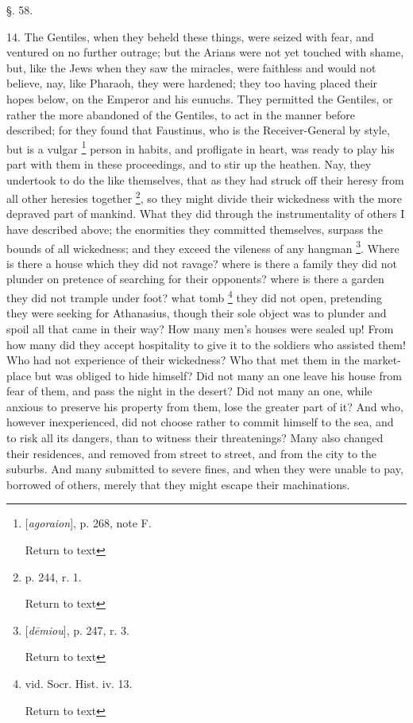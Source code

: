 §. 58.

14. The Gentiles, when they beheld these things,
were seized with fear, and ventured on no further outrage; but the
Arians were not yet touched with shame, but, like the Jews when
they saw the miracles, were faithless and would not believe, nay, like
Pharaoh, they were hardened; they too having placed their hopes below,
on the Emperor and his eunuchs. They permitted the Gentiles, or rather
the more abandoned of the Gentiles, to act in the manner before
described; for they found that Faustinus, who is the Receiver-General
by style, but is a vulgar \footnote{[\emph{agoraion}], p. 268, note F.

Return to text} person in habits, and profligate
in heart, was ready to play his part with them in these proceedings,
and to stir up the heathen. Nay, they undertook to do the like
themselves, that as they had struck off their heresy from all other
heresies together \footnote{p. 244, r. 1.

Return to text}, so they might divide their wickedness
with the more depraved part of mankind. What they did through the
instrumentality of others I have described above; the enormities they
committed themselves, surpass the bounds of all wickedness; and they
exceed the vileness of any hangman \footnote{[\emph{d\={e}miou}], p. 247, r. 3.

Return to text}. Where is there a house
which they did not ravage? where is there a family they did not
plunder on pretence of searching for their opponents? where is there a
garden they did not trample under foot? what tomb \footnote{vid. Socr. Hist. iv. 13.

Return to text} they did
not open, pretending they were seeking for Athanasius, though their
sole object was to plunder and spoil all that came in their way? How
many men's houses were sealed up! From how many did they accept
hospitality to give it to the soldiers who assisted them! Who had not
experience of their wickedness? Who that met them in the market-place
but was obliged to hide himself? Did not many an one leave his house
from fear of them, and pass the night in the desert? Did not many an
one, while anxious to preserve his property from them, lose the
greater part of it? And who, however inexperienced, did not choose
rather to commit himself to the sea, and to risk all its dangers, than
to witness their threatenings? Many also changed their residences, and
removed from street to street, and from the city to the suburbs. And
many submitted to severe fines, and when they were unable to pay,
borrowed of others, merely that they might escape their machinations.

